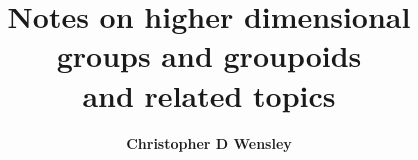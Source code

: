 \documentclass[11pt,a4paper]{article}
\begin{document}
  \title
  {\bf Notes on higher dimensional groups and groupoids \\
       and related topics}
    \author{{\bf Christopher D Wensley}}
  \maketitle

\tableofcontents

\newpage 

\newpage 

\newpage 

\newpage 


\newpage 

\newpage 

\newpage 

\newpage  


\newpage  


\newpage 

\newpage  

\newpage 

\newpage  


\newpage 

\newpage  

\newpage  

\newpage  

\newpage  

\newpage  

\printindex
\end{document}
